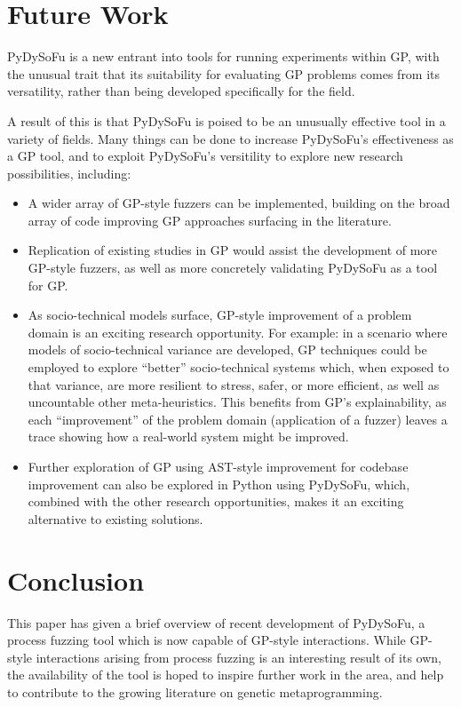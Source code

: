 \documentclass[draft,12pt]{llncs}   %
\begin{document}
\section{Future Work}
\label{sec:future_work}

PyDySoFu is a new entrant into tools for running experiments within GP, with the
unusual trait that its suitability for evaluating GP problems comes from its
versatility, rather than being developed specifically for the field.\par

A result of this is that PyDySoFu is poised to be an unusually effective tool in
a variety of fields. Many things can be done to increase PyDySoFu's
effectiveness as a GP tool, and to exploit PyDySoFu's versitility to explore new
research possibilities, including:

\begin{itemize}
\item A wider array of GP-style fuzzers can be implemented, building on the
  broad array of code improving GP approaches surfacing in the literature.

\item Replication of existing studies in GP would assist the development of more
GP-style fuzzers, as well as more concretely validating PyDySoFu as a tool for
GP.
  
\item As socio-technical models surface, GP-style improvement of a problem
  domain is an exciting research opportunity. For example: in a scenario where
  models of socio-technical variance are developed, GP techniques could be
  employed to explore ``better'' socio-technical systems which, when exposed to
  that variance, are more resilient to stress, safer, or more efficient, as well
  as uncountable other meta-heuristics. This benefits from GP's explainability,
  as each ``improvement'' of the problem domain (application of a fuzzer) leaves
  a trace showing how a real-world system might be improved.

\item Further exploration of GP using AST-style improvement for codebase
  improvement can also be explored in Python using PyDySoFu, which, combined
  with the other research opportunities, makes it an exciting alternative to
  existing solutions.
\end{itemize}


\section{Conclusion}
This paper has given a brief overview of recent development of PyDySoFu, a
process fuzzing tool which is now capable of GP-style interactions. While
GP-style interactions arising from process fuzzing is an interesting result of
its own, the availability of the tool is hoped to inspire further work in the
area, and help to contribute to the growing literature on genetic
metaprogramming.\par



\end{document}
